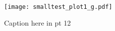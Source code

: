 \documentclass[11pt]{article}
\begin{document}
\begin{figure}[!h]
\center
	\texttt{[image: smalltest\_plot1\_g.pdf]}
	\caption{Caption here in pt 12}
\end{figure}
\end{document}
